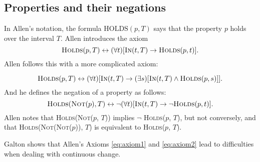 \subsection{Properties and their negations}
In Allen's notation, the formula $\text{HOLDS}(p, T)$ says that the property $p$ holds over the interval $T$.
Allen introduces the axiom
\begin{equation}
	\textsc{Holds}(p, T) \leftrightarrow (\forall t) [\textsc{In}(t, T) \to \textsc{Holds}(p, t)].
\end{equation}
Allen follows this with a more complicated axiom:

\begin{equation}
	\textsc{Holds}(p, T) \leftrightarrow (\forall t) [\textsc{In}(t, T) \to (\exists s)[\textsc{In}(t, T) \land \textsc{Holds}(p, s)]].
	\label{eq:axiom1}
\end{equation}
And he defines the negation of a property as follows:
\begin{equation}
	\textsc{Holds}(\textsc{Not}(p), T) \leftrightarrow \neg (\forall t) [\textsc{In}(t, T) \to \neg \textsc{Holds}(p, t)].
	\label{eq:axiom2}
\end{equation}
Allen notes that \textsc{Holds}(\textsc{Not}($p$, $T$)) implies $\neg$ \textsc{Holds}($p$, $T$), but not conversely, and that \textsc{Holds}(\textsc{Not}(\textsc{Not}($p$)), $T$) is equivalent to \textsc{Holds}($p$, $T$).

Galton shows that Allen's Axioms \ref{eq:axiom1} and \ref{eq:axiom2} lead to difficulties when dealing with continuous change.

